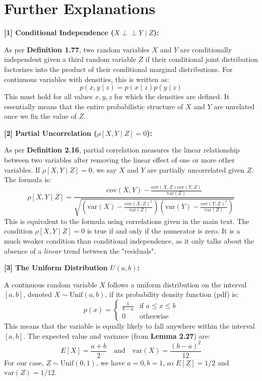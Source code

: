 \documentclass[11pt,a4paper]{article}
\begin{document}
\newpage
\section*{Further Explanations}
\hypertarget{note1}{\textbf{[1] Conditional Independence ($X \perp\perp Y \mid Z$):}}
As per \textbf{Definition 1.77}, two random variables $X$ and $Y$ are conditionally independent given a third random variable $Z$ if their conditional joint distribution factorizes into the product of their conditional marginal distributions. For continuous variables with densities, this is written as:
\[ p(x, y \mid z) = p(x \mid z) p(y \mid z) \]
This must hold for all values $x, y, z$ for which the densities are defined. It essentially means that the entire probabilistic structure of $X$ and $Y$ are unrelated once we fix the value of $Z$.

\vspace{1cm}
\hypertarget{note2}{\textbf{[2] Partial Uncorrelation ($\rho[X, Y \mid Z] = 0$):}}
As per \textbf{Definition 2.16}, partial correlation measures the linear relationship between two variables after removing the linear effect of one or more other variables. If $\rho[X, Y \mid Z] = 0$, we say $X$ and $Y$ are partially uncorrelated given $Z$. The formula is:
\[ \rho[X, Y \mid Z] = \frac{\text{cov}(X, Y) - \frac{\text{cov}(X, Z)\text{cov}(Y, Z)}{\text{var}(Z)}}{\sqrt{(\text{var}(X) - \frac{\text{cov}(X, Z)^2}{\text{var}(Z)})(\text{var}(Y) - \frac{\text{cov}(Y, Z)^2}{\text{var}(Z)})}} \]
This is equivalent to the formula using correlations given in the main text. The condition $\rho[X, Y \mid Z] = 0$ is true if and only if the numerator is zero. It is a much weaker condition than conditional independence, as it only talks about the absence of a \emph{linear} trend between the "residuals".

\vspace{1cm}
\hypertarget{note3}{\textbf{[3] The Uniform Distribution $U(a,b)$:}}
A continuous random variable $X$ follows a uniform distribution on the interval $[a, b]$, denoted $X \sim \text{Unif}(a,b)$, if its probability density function (pdf) is:
\[ p(x) = \begin{cases} \frac{1}{b-a} & \text{if } a \le x \le b \\ 0 & \text{otherwise} \end{cases} \]
This means that the variable is equally likely to fall anywhere within the interval $[a,b]$. The expected value and variance (from \textbf{Lemma 2.27}) are:
\[ E[X] = \frac{a+b}{2} \quad \text{and} \quad \text{var}(X) = \frac{(b-a)^2}{12} \]
For our case, $Z \sim \text{Unif}(0,1)$, we have $a=0, b=1$, so $E[Z] = 1/2$ and $\text{var}(Z) = 1/12$.
\end{document}
